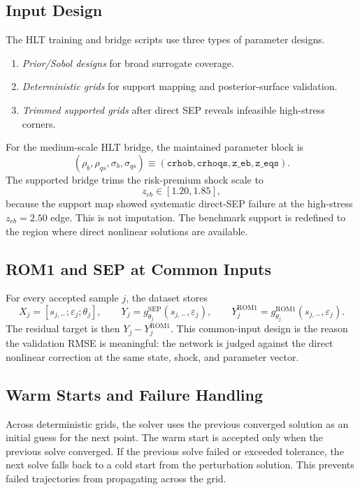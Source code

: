 \documentclass[12pt]{article}
\newcommand{\eps}{\varepsilon}
\newcommand{\rom}{\mathrm{ROM1}}
\newcommand{\sep}{\mathrm{SEP}}
\begin{document}
\subsection{Input Design}

The HLT training and bridge scripts use three types of parameter designs.
\begin{enumerate}[leftmargin=2em,itemsep=0.2em]
\item \emph{Prior/Sobol designs} for broad surrogate coverage.
\item \emph{Deterministic grids} for support mapping and posterior-surface
      validation.
\item \emph{Trimmed supported grids} after direct SEP reveals infeasible
      high-stress corners.
\end{enumerate}

For the medium-scale HLT bridge, the maintained parameter block is
\[
  (\rho_b,\rho_{qs},\sigma_b,\sigma_{qs})
  \equiv
  (\texttt{crhob},\texttt{crhoqs},\texttt{z\_eb},\texttt{z\_eqs}).
\]
The supported bridge trims the risk-premium shock scale to
\[
  z_{eb}\in[1.20,1.85],
\]
because the support map showed systematic direct-SEP failure at the
high-stress \(z_{eb}=2.50\) edge. This is not imputation. The benchmark support
is redefined to the region where direct nonlinear solutions are available.

\subsection{ROM1 and SEP at Common Inputs}

For every accepted sample \(j\), the dataset stores
\[
  X_j=[s_{j,-};\eps_j;\theta_j],\qquad
  Y_j=g^{\sep}_{\theta_j}(s_{j,-},\eps_j),\qquad
  Y^{\rom}_j=g^{\rom}_{\theta_j}(s_{j,-},\eps_j).
\]
The residual target is then \(Y_j-Y^{\rom}_j\). This common-input design is the
reason the validation RMSE is meaningful: the network is judged against the
direct nonlinear correction at the same state, shock, and parameter vector.

\subsection{Warm Starts and Failure Handling}

Across deterministic grids, the solver uses the previous converged solution as
an initial guess for the next point. The warm start is accepted only when the
previous solve converged. If the previous solve failed or exceeded tolerance,
the next solve falls back to a cold start from the perturbation solution. This
prevents failed trajectories from propagating across the grid.
\end{document}

